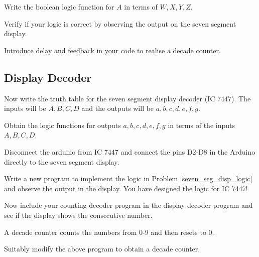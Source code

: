 \begin{problem}
	\label{counter_dec}

Write the boolean logic function for $A$ in terms of $W,X,Y,Z$.
\end{problem}
%

%
\begin{problem}
Verify if your logic is correct by observing the output on the seven segment display.
\end{problem}
%
\begin{problem}
Introduce delay and feedback in your code to realise a decade counter.
\end{problem}
\subsection{Display Decoder}
%
\begin{problem}
Now write the truth table for the seven segment display decoder (IC 7447).  The inputs will be $A,B,C,D$ and the outputs will be $a,b,c,d,e,f,g$.
\end{problem}
%
\begin{problem}
\label{seven_seg_disp_logic}
Obtain the logic functions for outputs $a,b,c,d,e,f,g$ in terms of the inputs $A,B,C,D$.
\end{problem}
\begin{problem}
Disconnect the arduino from IC 7447 and connect the pins D2-D8 in the Arduino directly to the seven segment display.
\end{problem}
\begin{problem}
Write a new program to implement the logic in Problem \ref{seven_seg_disp_logic} and observe the output in the display.  You have designed the logic for IC 7447!
\end{problem}
\begin{problem}
Now include your counting decoder program in the  display decoder program
and see if the display shows the consecutive number.
\end{problem}
A decade counter counts the numbers from 0-9 and then resets to 0.
\begin{problem}
Suitably modify the above program to obtain a decade counter.
\end{problem}
\setcounter{section}{3}
\setcounter{problem}{3}
\begin{table*}[t]
\centering

\caption{}
\label{fig:ff_ard_pin}
\end{table*}
\setcounter{section}{2}
\setcounter{problem}{2}

